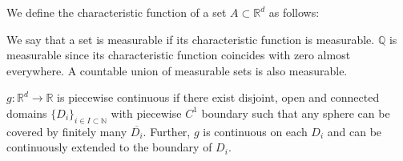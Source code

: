 We define the characteristic function of a set $A\subset \mathbb{R}^d$ as follows:

We say that a set is measurable if its characteristic function is measurable. $\mathbb{Q}$ is measurable since its characteristic function coincides with zero almost everywhere. A countable union of measurable sets is also measurable.

\begin{definition}
    $g:\mathbb{R}^d\rightarrow \mathbb{R}$ is piecewise continuous if there exist disjoint, open and connected domains $\{D_i\}_{i\in I\subset\mathbb{N}}$ with piecewise $C^1$ boundary such that any sphere can be covered by finitely many $\overline{D_i}.$ Further, $g$ is continuous on each $D_i$ and can be continuously extended to the boundary of $D_i.$
\end{definition}

